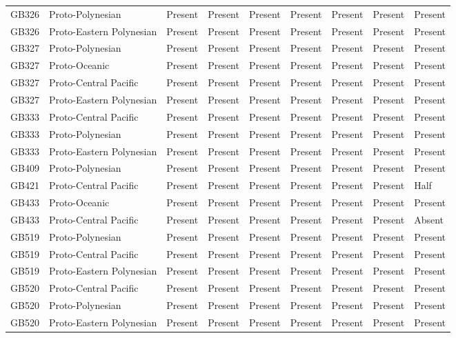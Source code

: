\begin{longtable}{p{1.5cm}p{2.5cm}p{2.5cm}p{2.5cm}p{2.5cm}p{2.5cm}p{2.5cm}p{2.5cm}p{2.5cm}}
  GB326 & Proto-Polynesian & Present & Present & Present & Present & Present & Present & Present \\ 
  GB326 & Proto-Eastern Polynesian & Present & Present & Present & Present & Present & Present & Present \\ 
  GB327 & Proto-Polynesian & Present & Present & Present & Present & Present & Present & Present \\ 
  GB327 & Proto-Oceanic & Present & Present & Present & Present & Present & Present & Present \\ 
  GB327 & Proto-Central Pacific & Present & Present & Present & Present & Present & Present & Present \\ 
  GB327 & Proto-Eastern Polynesian & Present & Present & Present & Present & Present & Present & Present \\ 
  GB333 & Proto-Central Pacific & Present & Present & Present & Present & Present & Present & Present \\ 
  GB333 & Proto-Polynesian & Present & Present & Present & Present & Present & Present & Present \\ 
  GB333 & Proto-Eastern Polynesian & Present & Present & Present & Present & Present & Present & Present \\ 
  GB409 & Proto-Polynesian & Present & Present & Present & Present & Present & Present & Present \\ 
  GB421 & Proto-Central Pacific & Present & Present & Present & Present & Present & Present & Half \\ 
  GB433 & Proto-Oceanic & Present & Present & Present & Present & Present & Present & Present \\ 
  GB433 & Proto-Central Pacific & Present & Present & Present & Present & Present & Present & Absent \\ 
  GB519 & Proto-Polynesian & Present & Present & Present & Present & Present & Present & Present \\ 
  GB519 & Proto-Central Pacific & Present & Present & Present & Present & Present & Present & Present \\ 
  GB519 & Proto-Eastern Polynesian & Present & Present & Present & Present & Present & Present & Present \\ 
  GB520 & Proto-Central Pacific & Present & Present & Present & Present & Present & Present & Present \\ 
  GB520 & Proto-Polynesian & Present & Present & Present & Present & Present & Present & Present \\ 
  GB520 & Proto-Eastern Polynesian & Present & Present & Present & Present & Present & Present & Present \\ 

\end{longtable}
